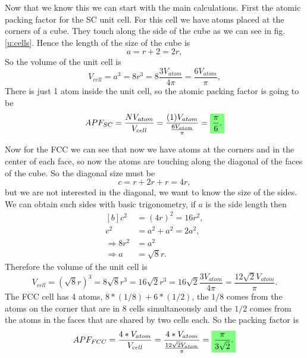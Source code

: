 \begin{questions}
\begin{solution}
Now that we know this we can start with the main calculations. First the atomic packing factor for the SC unit cell. For this cell we have atoms placed at the corners of a cube. They touch along the side of the cube as we can see in fig. \ref{u:cells}. Hence the length of the size of the cube is
\begin{equation*}
  a = r + 2 = 2r,
\end{equation*}
So the volume of the unit cell is
\begin{equation}
  V_{cell} = a^3 = 8r^3 =8\frac{3V_{atom}}{4\pi} =\frac{6V_{atom}}{\pi},
\end{equation}
There is just 1 atom inside the unit cell, so the atomic packing factor is going to be
\begin{equation}
  APF_{SC} = \frac{NV_{atom}}{V_{cell}} = \frac{(1)V_{atom}}{\frac{6V_{atom}}{\pi}} = \hlgreen{\frac{\pi}{6}.}
\end{equation}
\end{solution}
\begin{solution}
  Now for the FCC we can see that now we have atoms at the corners and in the center of each face, so now the atoms are touching along the diagonal of the faces of the cube. So the diagonal size must be
  \begin{equation}
    c = r + 2r + r = 4r,
  \end{equation}
  but we are not interested in the diagonal, we want to know the size of the sides. We can obtain such sides with basic trigonometry, if $a$ is the side length then
  \begin{equation}
    \begin{aligned}[b]
      c^2 &= (4r)^2 = 16r^2, \\
      c^2 &= a^2 + a^2 = 2a^2,\\
      \Rightarrow 8r^2 &= a^2\\
      \Rightarrow a &= \sqrt{8}r.
    \end{aligned}
  \end{equation}
  Therefore the volume of the unit cell is
  \begin{equation}
    V_{cell} = (\sqrt{8}r)^3 = 8\sqrt{8}r^3 = 16\sqrt{2}r^3 = 16\sqrt{2}\frac{3V_{atom}}{4\pi} = \frac{12\sqrt{2}V_{atom}}{\pi} .
  \end{equation}
  The FCC cell has 4 atoms, $8*(1/8) + 6*(1/2)$, the $1/8$ comes from the atoms on the corner that are in 8 cells simultaneously and the $1/2$ comes from the atoms in the faces that are shared by two cells each. So the packing factor is
  \begin{equation}
    APF_{FCC} = \frac{4*V_{atom}}{V_{cell}} = \frac{4*V_{atom}}{\frac{12\sqrt{2}V_{atom}}{\pi}} =  \hlgreen{\frac{\pi}{3\sqrt{2}}.}
  \end{equation}
\end{solution}


\end{questions}
